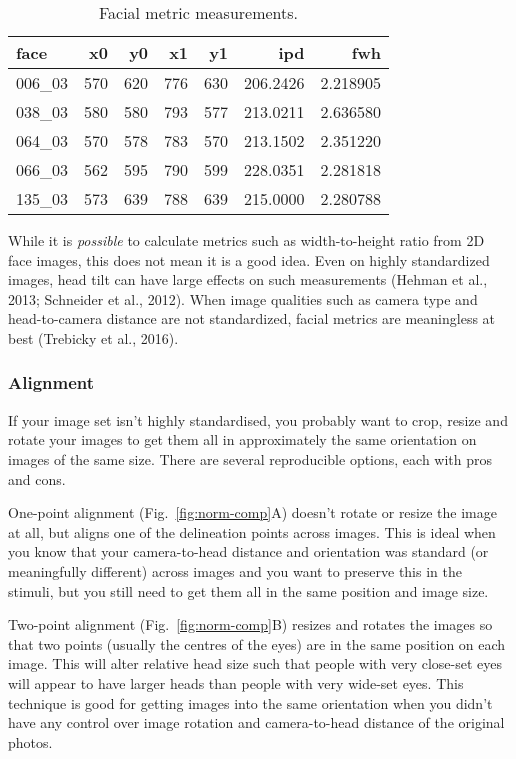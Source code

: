 \documentclass[
  doc,floatsintext]{apa6}
\begin{document}
\begin{table}

\caption{\label{tab:metrics}Facial metric measurements.}
\centering
\begin{tabular}[t]{l|r|r|r|r|r|r}
\hline
face & x0 & y0 & x1 & y1 & ipd & fwh\\
\hline
006\_03 & 570 & 620 & 776 & 630 & 206.2426 & 2.218905\\
\hline
038\_03 & 580 & 580 & 793 & 577 & 213.0211 & 2.636580\\
\hline
064\_03 & 570 & 578 & 783 & 570 & 213.1502 & 2.351220\\
\hline
066\_03 & 562 & 595 & 790 & 599 & 228.0351 & 2.281818\\
\hline
135\_03 & 573 & 639 & 788 & 639 & 215.0000 & 2.280788\\
\hline
\end{tabular}
\end{table}

While it is \emph{possible} to calculate metrics such as width-to-height ratio from 2D face images, this does not mean it is a good idea. Even on highly standardized images, head tilt can have large effects on such measurements (Hehman et al., 2013; Schneider et al., 2012). When image qualities such as camera type and head-to-camera distance are not standardized, facial metrics are meaningless at best (Trebicky et al., 2016).

\hypertarget{alignment}{%
\subsubsection{Alignment}\label{alignment}}

If your image set isn't highly standardised, you probably want to crop, resize and rotate your images to get them all in approximately the same orientation on images of the same size. There are several reproducible options, each with pros and cons.

One-point alignment (Fig.~\ref{fig:norm-comp}A) doesn't rotate or resize the image at all, but aligns one of the delineation points across images. This is ideal when you know that your camera-to-head distance and orientation was standard (or meaningfully different) across images and you want to preserve this in the stimuli, but you still need to get them all in the same position and image size.

Two-point alignment (Fig.~\ref{fig:norm-comp}B) resizes and rotates the images so that two points (usually the centres of the eyes) are in the same position on each image. This will alter relative head size such that people with very close-set eyes will appear to have larger heads than people with very wide-set eyes. This technique is good for getting images into the same orientation when you didn't have any control over image rotation and camera-to-head distance of the original photos.
\end{document}
